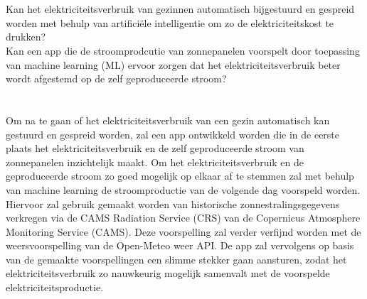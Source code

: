 \section{}%
\label{sec:onderzoeksvraag}


Kan het elektriciteitsverbruik van gezinnen automatisch bijgestuurd en gespreid worden met behulp van artificiële intelligentie om zo de elektriciteitskost te drukken? \\

Kan een app die de stroomprodcutie van zonnepanelen voorspelt door toepassing van machine learning (ML) ervoor zorgen dat het elektriciteitsverbruik beter wordt afgestemd op de zelf geproduceerde stroom?

\section{}%
\label{sec:onderzoeksdoelstelling}


Om na te gaan of het elektriciteitsverbruik van een gezin automatisch kan gestuurd en gespreid worden, zal een app ontwikkeld worden die in de eerste plaats het elektriciteitsverbruik en de zelf geproduceerde stroom van zonnepanelen inzichtelijk maakt. Om het elektriciteitsverbruik en de geproduceerde stroom zo goed mogelijk op elkaar af te stemmen zal met behulp van machine learning de stroomproductie van de volgende dag voorspeld worden. Hiervoor zal gebruik gemaakt worden van historische zonnestralingsgegevens verkregen via de CAMS Radiation Service (CRS) van de Copernicus Atmosphere Monitoring Service (CAMS). Deze voorspelling zal verder verfijnd worden met de weersvoorspelling van de Open-Meteo weer API. De app zal vervolgens op basis van de gemaakte voorspellingen een slimme stekker gaan aansturen, zodat het elektriciteitsverbruik zo nauwkeurig mogelijk samenvalt met de voorspelde elektriciteitsproductie. 

